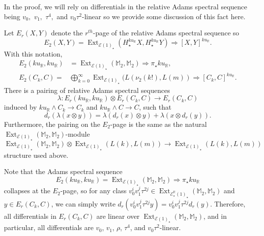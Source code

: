 \documentclass{amsart}
\theoremstyle{plain}
\numberwithin{equation}{section}
\numberwithin{figure}{section}
\DeclareMathOperator{\Ext}{Ext}
\newcommand{\mM}{{\mathbb M}}
\newcommand{\mR}{{\mathbb R}}
\newcommand{\cE}{{\mathcal E}}
\newcommand{\0}{\langle 0 \rangle }
\begin{document}
In the proof, we will rely on differentials in the relative Adams spectral sequence being $v_0,$ $v_1,$ $\tau^4,$ and $v_0 \tau^2$-linear so we provide some discussion of this fact here.  

Let $E_{r}(X,Y)$ denote the $r^{th}$-page of the relative Adams spectral sequence so 
\[E_{2}(X,Y) = \Ext_{\cE(1)_{\star}}(H_{\star}^{ku_{\mR}}X, H_{\star}^{ku_{\mR}}Y) \Longrightarrow [X,Y]^{ku_{\mR}} .\] 
With this notation, 
\begin{align*}
    E_{2}(ku_{\mR},ku_{\mR}) & = \Ext_{\cE(1)_{\star}}(\mM_{2}, \mM_{2}) \Longrightarrow \pi_{\star}ku_{\mR}, \\
    E_{2}(C_{k},C) = &\bigoplus\limits_{k=0}^{\infty}\Ext_{\cE(1)_{\star}}(L(\nu_{2}(k!), L(m))  \Longrightarrow [C_{k}, C]^{ku_{\mR}}.
\end{align*}
There is a pairing of relative Adams spectral sequences 
\[\lambda: E_{r}(ku_{\mR}, ku_{\mR}) \otimes E_{r}(C_{k}, C) \longrightarrow E_{r}(C_{k}, C) \]
induced by $ku_{\mR} \wedge C_{k} \to C_{k}$ and $ku_{\mR} \wedge C \to C$, such that 
\[d_{r}\left(\lambda(x \otimes y)\right) = \lambda\left(d_{r}(x)\otimes y\right) + \lambda\left(x\otimes d_{r}(y)\right).\]
Furthermore, the pairing on the $E_{2}$-page is the same as the natural $\Ext_{\cE(1)_{\star}}(\mM_{2}, \mM_{2})$-module 
\[\Ext_{\cE(1)_{\star}}(\mM_{2}, \mM_{2}) \otimes \Ext_{\cE(1)_{\star}}(L(k), L(m)) \longrightarrow \Ext_{\cE(1)_{\star}}(L(k), L(m))  \]
structure used above.

Note that the Adams spectral sequence \[ E_{2}(ku_{\mR},ku_{\mR}) = \Ext_{\cE(1)_{\star}}(\mM_{2}, \mM_{2}) \Longrightarrow \pi_{\star}ku_{\mR}  \]
collapses at the $E_{2}$-page, so for any class $v_{0}^{i}v_{1}^{j}\tau^{2j} \in \Ext_{\cE^\mR_\star(1)_{\star}}(\mM_{2}, \mM_{2})$ and $y \in E_{r}(C_{k}, C)$, we can simply write $d_{r}(v_{0}^{i}v_{1}^{j}\tau^{2j}y) = v_{0}^{i}v_{1}^{j}\tau^{2j}d_{r}(y)$. Therefore, all differentials in $E_{r}(C_{k}, C)$ are linear over $\Ext_{\cE(1)_{\star}}(\mM_{2}, \mM_{2})$, and in particular, all differentials are $v_{0}$, $v_{1}$, $\rho$, $\tau^{4}$, and $v_{0}\tau^{2}$-linear.
\end{document}
